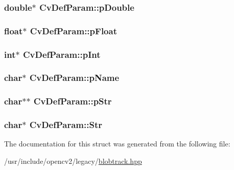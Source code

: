 \hypertarget{structCvDefParam_a171aac71c2ec7141591c74c07ff4d7a4}{
\subsubsection[{p\-Double}]{\setlength{\rightskip}{0pt plus 5cm}double$\ast$ Cv\-Def\-Param\-::p\-Double}}\label{structCvDefParam_a171aac71c2ec7141591c74c07ff4d7a4}
\hypertarget{structCvDefParam_ace15e986671c2e0077f6c7c20542df31}{
\subsubsection[{p\-Float}]{\setlength{\rightskip}{0pt plus 5cm}float$\ast$ Cv\-Def\-Param\-::p\-Float}}\label{structCvDefParam_ace15e986671c2e0077f6c7c20542df31}
\hypertarget{structCvDefParam_a76942902e96d3af10a57e541ad695e19}{
\subsubsection[{p\-Int}]{\setlength{\rightskip}{0pt plus 5cm}int$\ast$ Cv\-Def\-Param\-::p\-Int}}\label{structCvDefParam_a76942902e96d3af10a57e541ad695e19}
\hypertarget{structCvDefParam_a00d3066920cbdc6204a53fb14d96408f}{
\subsubsection[{p\-Name}]{\setlength{\rightskip}{0pt plus 5cm}char$\ast$ Cv\-Def\-Param\-::p\-Name}}\label{structCvDefParam_a00d3066920cbdc6204a53fb14d96408f}
\hypertarget{structCvDefParam_abbb4772f9b64b68e72d8f02c00e58efc}{
\subsubsection[{p\-Str}]{\setlength{\rightskip}{0pt plus 5cm}char$\ast$$\ast$ Cv\-Def\-Param\-::p\-Str}}\label{structCvDefParam_abbb4772f9b64b68e72d8f02c00e58efc}
\hypertarget{structCvDefParam_a2602cf197b1a178aafd1eb36a0cf0eb8}{
\subsubsection[{Str}]{\setlength{\rightskip}{0pt plus 5cm}char$\ast$ Cv\-Def\-Param\-::\-Str}}\label{structCvDefParam_a2602cf197b1a178aafd1eb36a0cf0eb8}


The documentation for this struct was generated from the following file\-:\begin{DoxyCompactItemize}
\item 
/usr/include/opencv2/legacy/\hyperlink{blobtrack_8hpp}{blobtrack.\-hpp}\end{DoxyCompactItemize}
